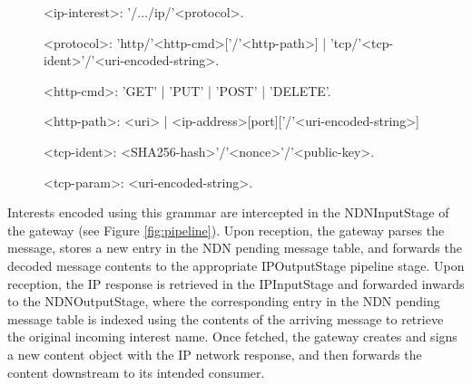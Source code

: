 \begin{figure}
\begin{mdframed}
\begingrammar
\noindent
<ip-interest>:	'/$\dots$/ip/'<protocol>.

<protocol>:	'http/'<http-cmd>[{'/'<http-path>}] | 'tcp/'<tcp-ident>'/'<uri-encoded-string>. 

<http-cmd>: 'GET' | 'PUT' | 'POST' | 'DELETE'.


<http-path>: <uri> | <ip-address>[port]['/'<uri-encoded-string>]

<tcp-ident>: <SHA256-hash>'/'<nonce>'/'<public-key>. %

<tcp-param>: <uri-encoded-string>.



		
\endgrammar
\end{mdframed}
\end{figure}

Interests encoded using this grammar are intercepted in the NDNInputStage of the gateway (see Figure \ref{fig:pipeline}). Upon reception, the gateway parses the message, stores a new entry in the NDN pending message table, and forwards the decoded message contents to the appropriate IPOutputStage pipeline stage. Upon reception, the IP response is retrieved in the IPInputStage and forwarded inwards to the NDNOutputStage, where the corresponding entry in the NDN pending message table is indexed using the contents of the arriving message to retrieve the original incoming interest name. Once fetched, the gateway creates and signs a new content object with the IP network response, and then forwards the content downstream to its intended consumer. 

